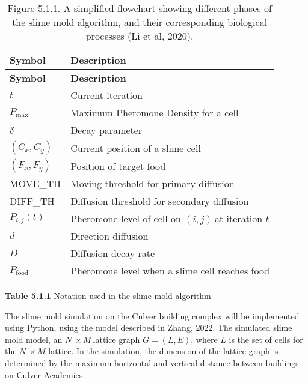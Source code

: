 \documentclass[11pt]{article}
\begin{document}
\begin{longtable}[]{@{}
  >{\raggedright\arraybackslash}p{}
  >{\raggedright\arraybackslash}p{}@{}}
\caption{Figure 5.1.1. A simplified flowchart showing different phases
of the slime mold algorithm, and their corresponding biological
processes (Li et al, 2020).}\tabularnewline
\toprule\noalign{}
\begin{minipage}[b]{\linewidth}\raggedright
\textbf{Symbol}
\end{minipage} & \begin{minipage}[b]{\linewidth}\raggedright
\textbf{Description}
\end{minipage} \\
\midrule\noalign{}
\endfirsthead
\toprule\noalign{}
\begin{minipage}[b]{\linewidth}\raggedright
\textbf{Symbol}
\end{minipage} & \begin{minipage}[b]{\linewidth}\raggedright
\textbf{Description}
\end{minipage} \\
\midrule\noalign{}
\endhead
\bottomrule\noalign{}
\endlastfoot
\(t\) & Current iteration \\
\(P_{\max}\) & Maximum Pheromone Density for a cell \\
\(\delta\) & Decay parameter \\
\(\left( C_{x},C_{y} \right)\) & Current position of a slime cell \\
\(\left( F_{x},F_{y} \right)\) & Position of target food \\
MOVE\_TH & Moving threshold for primary diffusion \\
DIFF\_TH & Diffusion threshold for secondary diffusion \\
\(P_{i,j}(t)\) & Pheromone level of cell on \((i,j)\ \)at iteration
\(t\) \\
\(d\) & Direction diffusion \\
\(D\) & Diffusion decay rate \\
\(P_{\text{food}}\) & Pheromone level when a slime cell reaches food \\
\end{longtable}

\textbf{Table 5.1.1} Notation used in the slime mold algorithm

The slime mold simulation on the Culver building complex will be
implemented using Python, using the model described in Zhang, 2022. The
simulated slime mold model, an \(N\  \times M\ \)lattice graph
\(G = (L,E)\), where \(L\) is the set of cells for the \(N\  \times M\)
lattice. In the simulation, the dimension of the lattice graph is
determined by the maximum horizontal and vertical distance between
buildings on Culver Academies.
\end{document}
